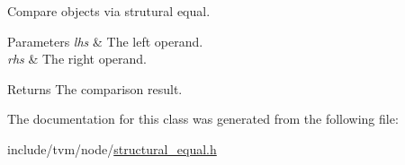 Compare objects via strutural equal. 


\begin{DoxyParams}{Parameters}
{\em lhs} & The left operand. \\
\hline
{\em rhs} & The right operand. \\
\hline
\end{DoxyParams}
\begin{DoxyReturn}{Returns}
The comparison result. 
\end{DoxyReturn}


The documentation for this class was generated from the following file\+:\begin{DoxyCompactItemize}
\item 
include/tvm/node/\hyperlink{structural__equal_8h}{structural\+\_\+equal.\+h}\end{DoxyCompactItemize}
